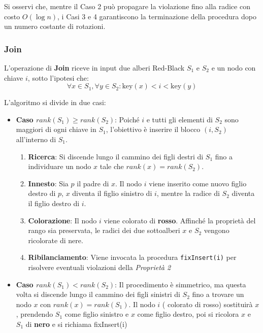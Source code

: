\begin{remark}
    Si osservi che, mentre il Caso 2 può propagare la violazione fino alla radice con costo $O(\log n)$, i Casi 3 e 4 garantiscono la terminazione della procedura dopo un numero costante di rotazioni.
\end{remark}


\subsubsection{Join}

L'operazione di \textbf{Join} riceve in input due alberi Red-Black $S_1$ e $S_2$ e un nodo con chiave $i$, sotto l'ipotesi che:
\[ \forall x \in S_1, \forall y \in S_2 : \text{key}(x) < i < \text{key}(y) \]


L'algoritmo si divide in due casi:
\begin{itemize}
    \item \textbf{Caso $rank(S_1) \geq rank(S_2)$}: 
    Poiché $i$ e tutti gli elementi di $S_2$ sono maggiori di ogni chiave in $S_1$, l'obiettivo è inserire il blocco $(i, S_2)$ all'interno di $S_1$.
    \begin{enumerate}
        \item \textbf{Ricerca}: Si discende lungo il cammino dei figli destri di $S_1$ fino a individuare un nodo $x$ tale che $rank(x) = rank(S_2)$.
        \item \textbf{Innesto}: Sia $p$ il padre di $x$. Il nodo $i$ viene inserito come nuovo figlio destro di $p$, $x$ diventa il figlio sinistro di $i$, mentre la radice di $S_2$ diventa il figlio destro di $i$.
        \item \textbf{Colorazione}: Il nodo $i$ viene colorato di \textbf{rosso}. Affinché la proprietà del rango sia preservata, le radici dei due sottoalberi $x$ e $S_2$ vengono ricolorate di nere.
        \item \textbf{Ribilanciamento}: Viene invocata la procedura \texttt{fixInsert(i)} per risolvere eventuali violazioni della \textit{Proprietà 2}
    \end{enumerate}

    \item \textbf{Caso $rank(S_1) < rank(S_2)$}:
    Il procedimento è simmetrico, ma questa volta si discende lungo il cammino dei figli sinistri di $S_2$ fino a trovare un nodo $x$ con $rank(x) = rank(S_1)$. Il nodo $i$ ( colorato di rosso) sostituirà $x$, prendendo $S_1$ come figlio sinistro e $x$ come figlio destro, poi si ricolora $x$ e $S_1$ di \textbf{nero} e si richiama fixInsert(i)
\end{itemize}
